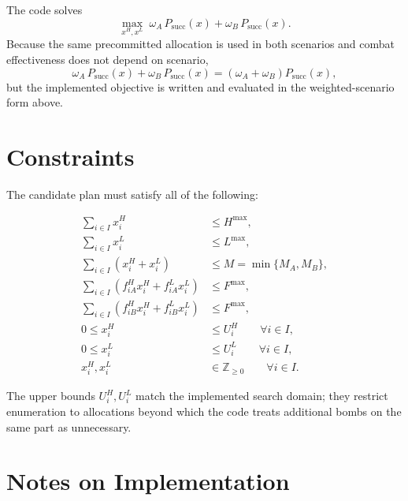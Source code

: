 The code solves
\[
\max_{x^H,x^L}\;
\omega_A\,P_{\mathrm{succ}}(x)+\omega_B\,P_{\mathrm{succ}}(x).
\]
Because the same precommitted allocation is used in both scenarios and combat effectiveness does not depend on scenario,
\[
\omega_A\,P_{\mathrm{succ}}(x)+\omega_B\,P_{\mathrm{succ}}(x)
=
(\omega_A+\omega_B)P_{\mathrm{succ}}(x),
\]
but the implemented objective is written and evaluated in the weighted-scenario form above.

\section*{Constraints}

The candidate plan must satisfy all of the following:

\begin{align}
\sum_{i\in I} x_i^H &\le H^{\max}, \\
\sum_{i\in I} x_i^L &\le L^{\max}, \\
\sum_{i\in I} (x_i^H+x_i^L) &\le M = \min\{M_A,M_B\}, \\
\sum_{i\in I} \left(f_{iA}^H x_i^H + f_{iA}^L x_i^L\right) &\le F^{\max}, \\
\sum_{i\in I} \left(f_{iB}^H x_i^H + f_{iB}^L x_i^L\right) &\le F^{\max}, \\
0 \le x_i^H &\le U_i^H \qquad \forall i\in I, \\
0 \le x_i^L &\le U_i^L \qquad \forall i\in I, \\
x_i^H, x_i^L &\in \mathbb{Z}_{\ge 0} \qquad \forall i\in I.
\end{align}

The upper bounds $U_i^H,U_i^L$ match the implemented search domain; they restrict enumeration to allocations beyond which the code treats additional bombs on the same part as unnecessary.

\section*{Notes on Implementation}

